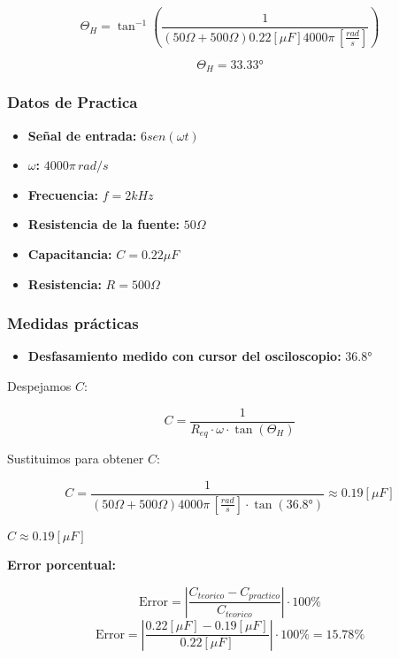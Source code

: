 \documentclass[12pt, letterpaper]{article}
\begin{document}
\[
\Theta_H = \tan^{-1}\left(\frac{1}{(50\Omega + 500\Omega)0.22[\mu F] 4000 \pi \, \left[\frac{rad}{s} \right]}\right)
\]

\[
\Theta_H = 33.33°
\]

\subsubsection*{Datos de Practica}

\begin{itemize}
	\item \textbf{Señal de entrada:} \(6 sen (\omega t)\)
	\item \textbf{\(\omega\):} \(4000 \pi \, rad/s\)
	\item \textbf{Frecuencia:} \(f = 2 kHz\)
	\item \textbf{Resistencia de la fuente:} \(50 \Omega\)
	\item \textbf{Capacitancia:} \(C =  0.22 \mu F\)
	\item \textbf{Resistencia:} \(R = 500 \Omega\)
\end{itemize}

\subsubsection*{Medidas prácticas}

\begin{itemize}
	\item \textbf{Desfasamiento medido con cursor del osciloscopio:} \(36.8°\)
\end{itemize}

Despejamos \(C\):

\[
C = \frac{1}{R_{eq}\cdot \omega \cdot \tan(\Theta_H)}
\]

Sustituimos para obtener \(C\):

\[
C = \frac{1}{(50\Omega + 500\Omega) 4000 \pi \, \left[\frac{rad}{s} \right]\cdot \tan(36.8°)} \approx 0.19[\mu F]
\]

\begin{tcolorbox}[colback=mygray, colframe=LimeGreen, boxrule=0.7pt, arc=2pt, boxsep=1pt, left=2pt, right=2pt, top=2pt, bottom=2pt, title=Medida del capacitor con cursor]
\(C \approx 0.19 [\mu F]\)
\end{tcolorbox}

\textbf{Error porcentual:}

\[
\text{Error} = \left| \frac{C_{teorico} - C_{practico}}{C_{teorico}} \right| \cdot 100\%
\]
\[
\text{Error} = \left| \frac{0.22 [\mu F] - 0.19 [\mu F]}{0.22 [\mu F]} \right| \cdot 100\% = 15.78\%
\]
\end{document}
